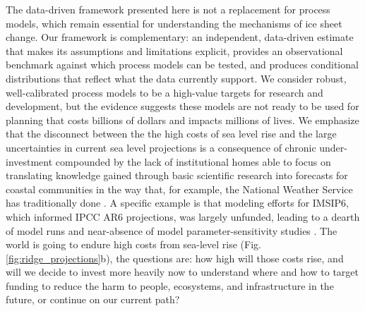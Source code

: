 \documentclass[12pt]{article}
\begin{document}
The data-driven framework presented here is not a replacement for process models, which remain essential for understanding the mechanisms of ice sheet change. Our framework is complementary: an independent, data-driven estimate that makes its assumptions and limitations explicit, provides an observational benchmark against which process models can be tested, and produces conditional distributions that reflect what the data currently support. We consider robust, well-calibrated process models to be a high-value targets for research and development, but the evidence suggests these models are not ready to be used for planning that costs billions of dollars and impacts millions of lives. We emphasize that the disconnect between the the high costs of sea level rise and the large uncertainties in current sea level projections is a consequence of chronic under-investment compounded by the lack of institutional homes able to focus on translating knowledge gained through basic scientific research into forecasts for coastal communities in the way that, for example, the National Weather Service has traditionally done \citep{Catania2022}. A specific example is that modeling efforts for IMSIP6, which informed IPCC AR6 projections, was largely unfunded, leading to a dearth of model runs and near-absence of model parameter-sensitivity studies \citep{Aschwanden2021}. The world is going to endure high costs from sea-level rise (Fig. \ref{fig:ridge_projections}b), the questions are: how high will those costs rise, and will we decide to invest more heavily now to understand where and how to target funding to reduce the harm to people, ecosystems, and infrastructure in the future, or continue on our current path?


\end{document}
